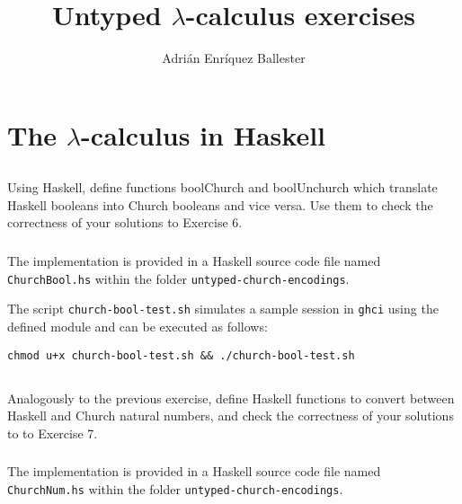 \documentclass{article}
\title{Untyped $\lambda$-calculus exercises}
\author{Adrián Enríquez Ballester}
\begin{document}
\maketitle

\section*{The $\lambda$-calculus in Haskell}

\setcounter{subsection}{10}

\subsection{}\label{ex:11}

Using Haskell, define functions boolChurch and boolUnchurch 
which translate Haskell booleans into Church booleans and 
vice versa. Use them to check the correctness of your 
solutions to Exercise 6.

\subsubsection{}

The implementation is provided in a Haskell source code file
named \verb|ChurchBool.hs| within the folder 
\verb|untyped-church-encodings|.

The script \verb|church-bool-test.sh| simulates a sample session
in \verb|ghci| using the defined module and can be executed as 
follows:

\begin{verbatim}
chmod u+x church-bool-test.sh && ./church-bool-test.sh
\end{verbatim}

\subsection{}\label{ex:12}

Analogously to the previous exercise, define Haskell 
functions to convert between Haskell and Church natural 
numbers, and check the correctness of your solutions to 
to Exercise 7.

\subsubsection{}

The implementation is provided in a Haskell source code file
named \verb|ChurchNum.hs| within the folder 
\verb|untyped-church-encodings|.
\end{document}
